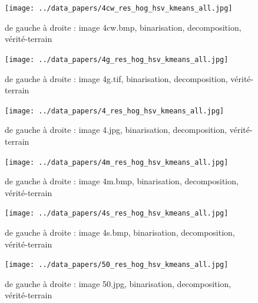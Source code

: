 \documentclass{book}
\begin{document}
\begin{figure}[H]
\begin{center}
\texttt{[image: ../data\_papers/4cw\_res\_hog\_hsv\_kmeans\_all.jpg]}
\end{center}
\caption{de gauche à droite : image 4cw.bmp, binarisation, decomposition, vérité-terrain}
\label{4cw}
\end{figure}
\clearpage


\begin{figure}[H]
\begin{center}
\texttt{[image: ../data\_papers/4g\_res\_hog\_hsv\_kmeans\_all.jpg]}
\end{center}
\caption{de gauche à droite : image 4g.tif, binarisation, decomposition, vérité-terrain}
\label{4g}
\end{figure}
\clearpage


\begin{figure}[H]
\begin{center}
\texttt{[image: ../data\_papers/4\_res\_hog\_hsv\_kmeans\_all.jpg]}
\end{center}
\caption{de gauche à droite : image 4.jpg, binarisation, decomposition, vérité-terrain}
\label{4}
\end{figure}
\clearpage


\begin{figure}[H]
\begin{center}
\texttt{[image: ../data\_papers/4m\_res\_hog\_hsv\_kmeans\_all.jpg]}
\end{center}
\caption{de gauche à droite : image 4m.bmp, binarisation, decomposition, vérité-terrain}
\label{4m}
\end{figure}
\clearpage


\begin{figure}[H]
\begin{center}
\texttt{[image: ../data\_papers/4s\_res\_hog\_hsv\_kmeans\_all.jpg]}
\end{center}
\caption{de gauche à droite : image 4s.bmp, binarisation, decomposition, vérité-terrain}
\label{4s}
\end{figure}
\clearpage


\begin{figure}[H]
\begin{center}
\texttt{[image: ../data\_papers/50\_res\_hog\_hsv\_kmeans\_all.jpg]}
\end{center}
\caption{de gauche à droite : image 50.jpg, binarisation, decomposition, vérité-terrain}
\label{50}
\end{figure}
\clearpage
\end{document}

